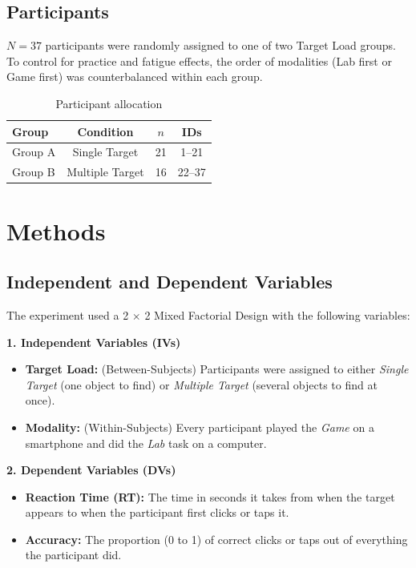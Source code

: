 \documentclass[12pt]{article}
\begin{document}
\subsection{Participants}

$N = 37$ participants were randomly assigned to one of two Target Load groups.
To control for practice and fatigue effects, the order of modalities (Lab first or Game first) was counterbalanced within each group.

\begin{table}[h]
\centering
\begin{tabular}{lccc}
\toprule
Group & Condition & $n$ & IDs \\
\midrule
Group A & Single Target & 21 & 1--21 \\
Group B & Multiple Target & 16 & 22--37 \\
\bottomrule
\end{tabular}
\caption{Participant allocation}
\end{table}

\section{Methods}

\subsection{Independent and Dependent Variables}

The experiment used a 2 $\times$ 2 Mixed Factorial Design with the following variables:

\textbf{1. Independent Variables (IVs)}
\begin{itemize}
  \item \textbf{Target Load:} (Between-Subjects) Participants were assigned to either \textit{Single Target} (one object to find) or \textit{Multiple Target} (several objects to find at once).
  \item \textbf{Modality:} (Within-Subjects) Every participant played the \textit{Game} on a smartphone and did the \textit{Lab} task on a computer.
\end{itemize}

\textbf{2. Dependent Variables (DVs)}
\begin{itemize}
  \item \textbf{Reaction Time (RT):} The time in seconds it takes from when the target appears to when the participant first clicks or taps it.
  \item \textbf{Accuracy:} The proportion (0 to 1) of correct clicks or taps out of everything the participant did.
\end{itemize}
\end{document}
